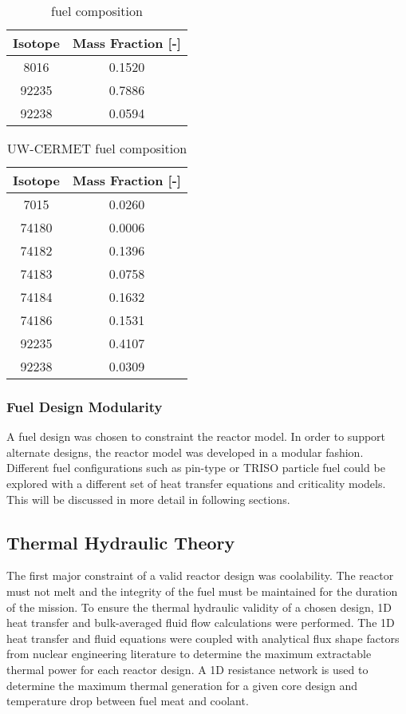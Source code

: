 \begin{table}[h]
  \centering
  \caption{\uox fuel composition}
  \begin{tabular}{cc}
    \toprule
    Isotope   & Mass Fraction [-] \\
    \midrule
     8016     & 0.1520 \\
    92235     & 0.7886 \\
    92238     & 0.0594 \\
  \end{tabular}
  \label{tab:uox_comp}
\end{table}
    
\begin{table}[h]
  \centering
  \caption{UW-CERMET fuel composition}
  \begin{tabular}{cc}
    \toprule
    Isotope   & Mass Fraction [-] \\
    \midrule
     7015     &  0.0260 \\
     74180    &  0.0006 \\ 
     74182    &  0.1396 \\
     74183    &  0.0758 \\
     74184    &  0.1632 \\
     74186    &  0.1531 \\
     92235    &  0.4107 \\
     92238    &  0.0309 \\
  \end{tabular}
  \label{tab:uw_comp}
\end{table}

\subsubsection{Fuel Design Modularity}
A fuel design was chosen to constraint the reactor model. In order to support
alternate designs, the reactor model was developed in a modular fashion.
Different fuel configurations such as pin-type or TRISO particle fuel could be
explored with a different set of heat transfer equations and criticality models.
This will be discussed in more detail in following sections.

\subsection{Thermal Hydraulic Theory}
    The first major constraint of a valid reactor design was coolability. The reactor must
not melt and the integrity of the fuel must be maintained for the duration of
the mission. To ensure the thermal hydraulic validity of a chosen design, 
    1D heat transfer and bulk-averaged fluid flow calculations were performed. The 1D
heat transfer and fluid equations were coupled with analytical flux shape
factors from nuclear engineering literature to determine the maximum extractable
thermal power for each reactor design. A 1D resistance network is used to
determine the maximum thermal generation for a given core design and temperature
drop between fuel meat and coolant.

